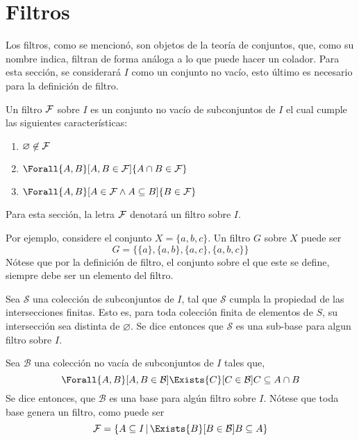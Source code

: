 \section{Filtros}

Los filtros, como se mencionó, son objetos de la teoría de conjuntos,
que, como su nombre indica, filtran de forma análoga a lo que
puede hacer un colador. Para esta sección, se considerará $I$ como un
conjunto no vacío, esto último es necesario para la definición de filtro.

\begin{definition}\label{def:filtro}
  Un filtro $\mathcal{F}$ sobre $I$ es un conjunto no vacío de subconjuntos de $I$
  el cual cumple las siguientes características:
  \begin{enumerate}
    \item $\varnothing \not\in \mathcal{F}$
    \item $\Forall{A,B}[A,B \in \F]{A\cap B \in \F}$
    \item $\Forall{A,B}[A\in \F \land A \subseteq B]{B \in \F}$
  \end{enumerate}

  Para esta sección, la letra $\mathcal{F}$ denotará un filtro sobre $I$.
\end{definition}

Por ejemplo, considere el conjunto $X=\{a,b,c\}$. Un filtro $G$ sobre $X$
puede ser 
\[G = \{\{a\}, \{a,b\}, \{a,c\}, \{a,b,c\}\}\]
Nótese que por la definición de filtro, el conjunto sobre el que este se
define, siempre debe ser un elemento del filtro.

\begin{definition}
  Sea $\mathcal{S}$ una colección de subconjuntos de $I$, tal que
  $\mathcal{S}$ cumpla la propiedad de las intersecciones finitas. Esto es,
  para toda colección finita de elementos de $S$, su intersección sea
  distinta de $\varnothing$. Se dice entonces que $\mathcal{S}$ es una
  sub-base para algun filtro sobre $I$.
\end{definition}

\begin{definition}
  Sea $\mathcal{B}$ una colección no vacía de subconjuntos de $I$ tales
  que,
  \[
    \Forall{A,B}[A,B \in \mathcal{B}]{
      \Exists{C}[C\in\mathcal{B}]{C \subseteq A \cap B}
      }
  \]
  Se dice entonces, que $\mathcal{B}$ es una base para algún filtro sobre $I$.
  Nótese que toda base genera un filtro, como puede ser
  \[\F = \{A \subseteq I \,|\, \Exists{B}[B\in\mathcal{B}]{B\subseteq A}\}\]
\end{definition}


